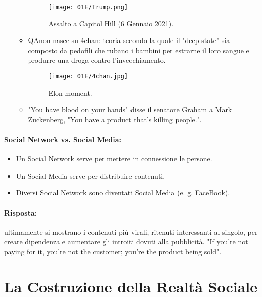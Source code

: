 \begin{itemize}
\begin{itemize}
\begin{figure}[h]
    \centering
    \texttt{[image: 01E/Trump.png]}
    \caption{Assalto a Capitol Hill (6 Gennaio 2021).}
\end{figure}
\item QAnon nasce su 4chan: teoria secondo la quale il "deep state" sia composto da pedofili che rubano i bambini per estrarne il loro sangue e produrre una droga contro l'invecchiamento.
  \begin{figure}[h]
    \centering
    \texttt{[image: 01E/4chan.jpg]}
    \caption{Elon moment.}
\end{figure}
\item "You have blood on your hands" disse il senatore Graham a Mark Zuckenberg, "You have a product that's killing people.". 
    \end{itemize}
\end{itemize}

\paragraph{Social Network vs. Social Media:}

\begin{itemize}
  \item Un Social Network serve per mettere in connessione le persone. 
  \item Un Social Media serve per distribuire contenuti. 
  \item Diversi Social Network sono diventati Social Media (e. g. FaceBook).
\end{itemize}


\paragraph{Risposta:} ultimamente si mostrano i contenuti più virali, ritenuti interessanti al singolo, per creare dipendenza e aumentare gli introiti dovuti alla pubblicità. "If you're not paying for it, you're not the customer; you're the product being sold".

\section{La Costruzione della Realtà Sociale}


